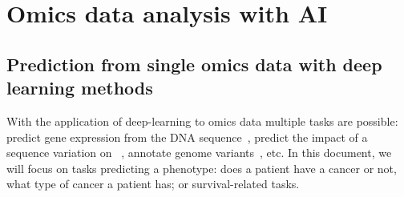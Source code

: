 \documentclass[../main.tex]{subfiles}
\begin{document}
\chapter{Omics data analysis with AI}\label{chap:sota}
\minitocpagecentered

\section[Deep learning and single omics data]{Prediction from single omics data with deep learning methods}
	With the application of deep-learning to omics data multiple tasks are possible: predict gene expression from the DNA sequence~\cite{Avsec2021}, predict the impact of a sequence variation on ~\cite{Zeng2017}, annotate genome variants~\cite{Quang2014}, etc\@.
	In this document, we will focus on tasks predicting a phenotype: does a patient have a cancer or not, what type of cancer a patient has; or survival-related tasks.
\end{document}
